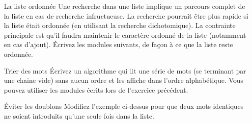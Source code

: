 	\liststyleExercice
	
\begin{Exercice}{La liste ordonnée}
		Une recherche dans une liste implique un parcours complet de la liste en
		cas de recherche infructueuse. La recherche pourrait être plus rapide
		si la liste était ordonnée (en utilisant la recherche dichotomique). La
		contrainte principale est qu'il faudra maintenir le
		caractère ordonné de la liste (notamment en cas
		d'ajout). Écrivez les modules suivants, de façon à ce
		que la liste reste ordonnée.


\end{Exercice}

\begin{Exercice}{Trier des mots}
		Écrivez un algorithme qui lit une série de mots (se terminant par une
		chaine vide) sans aucun ordre et les affiche dans l’ordre alphabétique.
		Vous pouvez utiliser les modules écrits lors de
		l'exercice précédent.
		
\end{Exercice}

\begin{Exercice}{Éviter les doublons}
		Modifiez l’exemple ci-dessus pour que deux mots identiques ne soient
		introduits qu’une seule fois dans la liste.
\end{Exercice}

